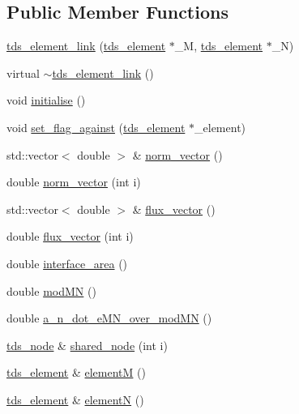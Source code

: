 \subsection*{Public Member Functions}
\begin{DoxyCompactItemize}
\item 
\hyperlink{classtds__element__link_a5e72d17aa56494cd0dd7182a0eb87f54}{tds\-\_\-element\-\_\-link} (\hyperlink{classtds__element}{tds\-\_\-element} $\ast$\-\_\-\-M, \hyperlink{classtds__element}{tds\-\_\-element} $\ast$\-\_\-\-N)
\item 
virtual \hyperlink{classtds__element__link_a77a09ccea865dd165d6924a69079df19}{$\sim$tds\-\_\-element\-\_\-link} ()
\item 
void \hyperlink{classtds__element__link_a17a877d4b5b8d4e6ec377bb9ccab4e30}{initialise} ()
\item 
void \hyperlink{classtds__element__link_ad3cf1016587c8d7b9f8417db3459798c}{set\-\_\-flag\-\_\-against} (\hyperlink{classtds__element}{tds\-\_\-element} $\ast$\-\_\-element)
\item 
std\-::vector$<$ double $>$ \& \hyperlink{classtds__element__link_ad8933188624708b7a49f5f7a881f67d8}{norm\-\_\-vector} ()
\item 
double \hyperlink{classtds__element__link_affc5b4d4c6654a65b1067652080b0310}{norm\-\_\-vector} (int i)
\item 
std\-::vector$<$ double $>$ \& \hyperlink{classtds__element__link_ae632fb7dc13fb84791eec31630618101}{flux\-\_\-vector} ()
\item 
double \hyperlink{classtds__element__link_a8d731714b11fd0da48fc7ca2f1ed5f9e}{flux\-\_\-vector} (int i)
\item 
double \hyperlink{classtds__element__link_a024e6be6142af6d8a92263d4a7903389}{interface\-\_\-area} ()
\item 
double \hyperlink{classtds__element__link_acfbf3ede6d850deb4a32c24c958e9a0d}{mod\-M\-N} ()
\item 
double \hyperlink{classtds__element__link_aec8d8d5c53c039dda59aecc430a0f885}{a\-\_\-n\-\_\-dot\-\_\-e\-M\-N\-\_\-over\-\_\-mod\-M\-N} ()
\item 
\hyperlink{classtds__node}{tds\-\_\-node} \& \hyperlink{classtds__element__link_a6c1da2a8aeca0e3d97f0dd02327a0a23}{shared\-\_\-node} (int i)
\item 
\hyperlink{classtds__element}{tds\-\_\-element} \& \hyperlink{classtds__element__link_aa5357b3d1042d36296c67b31eb01e17b}{element\-M} ()
\item 
\hyperlink{classtds__element}{tds\-\_\-element} \& \hyperlink{classtds__element__link_a09a9283ddd611ab673b55c006aefb372}{element\-N} ()

\end{DoxyCompactItemize}
